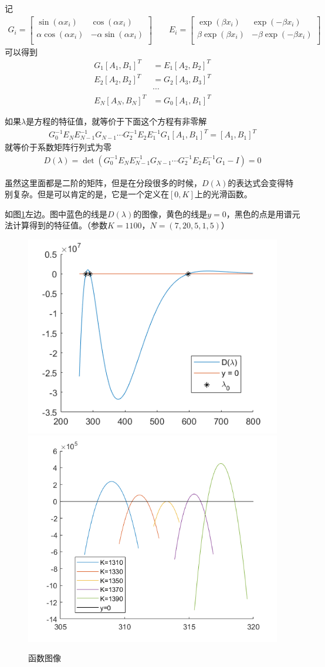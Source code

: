 \documentclass[12pt,a4paper]{article}
\begin{document}
记
\begin{align*}
G_i = \left[\begin{array}{cc}
\sin(\alpha x_i) & \cos(\alpha x_i) \\
\alpha \cos(\alpha x_i) & - \alpha \sin(\alpha x_i) \\
\end{array}\right]
\qquad
E_i = \left[\begin{array}{cc}
\exp(\beta x_i) & \exp(-\beta x_i) \\
\beta \exp(\beta x_i) & - \beta \exp(-\beta x_i) \\
\end{array}\right]
\end{align*}
可以得到
\begin{align*}
G_1 [A_1, B_1]^T & = E_1 [A_2, B_2]^T \\
E_2 [A_2, B_2]^T & = G_2 [A_3, B_3]^T \\
& \cdots \\
E_N [A_N, B_N]^T & = G_0 [A_1, B_1]^T
\end{align*}

如果$\lambda$是方程的特征值，就等价于下面这个方程有非零解
\begin{align*}
G_0^{-1} E_{N} E_{N-1}^{-1} G_{N-1} \cdots G_2^{-1} E_2 E_1^{-1} G_1 [A_1, B_1]^T = [A_1, B_1]^T
\end{align*}
就等价于系数矩阵行列式为零
\begin{align*}
D(\lambda) = \det(G_0^{-1} E_N E_{N-1}^{-1} G_{N-1} \cdots G_2^{-1} E_2 E_1^{-1} G_1 - I) = 0
\end{align*}

虽然这里面都是二阶的矩阵，但是在分段很多的时候，$D(\lambda)$的表达式会变得特别复杂。但是可以肯定的是，它是一个定义在$[0,K]$上的光滑函数。

如图\ref{f1}左边。图中蓝色的线是$D(\lambda)$的图像，黄色的线是$y=0$，黑色的点是用谱元法计算得到的特征值。（参数$K=1100$，$N=(7,20,5,1,5)$）
\begin{figure}[h]
\centering
\includegraphics[width=0.4\linewidth]{1}
\includegraphics[width=0.4\linewidth]{2}
\caption{函数图像}
\label{f1}
\end{figure}
\end{document}
